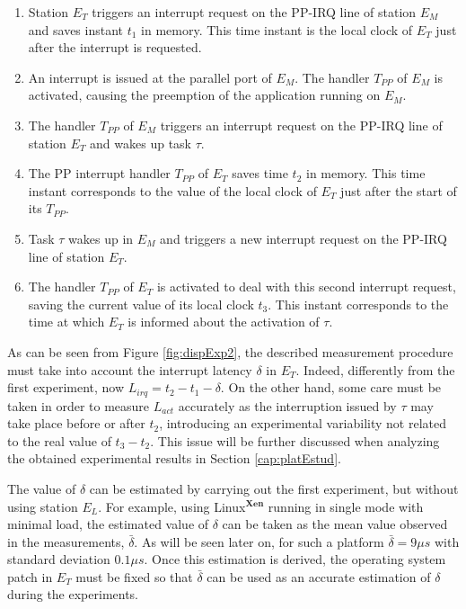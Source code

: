 \documentclass{acm_proc_article-sp}
\begin{document}
\begin{enumerate}
\item Station $E_T$ triggers an interrupt request on the PP-IRQ line of station
  $E_M$ and saves instant $t_1$ in memory. This time instant is the local clock of
  $E_T$ just after the interrupt is requested.
 
\item An interrupt is issued at the parallel port of $E_M$. The handler
  $T_{PP}$ of $E_M$ is activated, causing the preemption of the application running on
  $E_M$.

\item The handler $T_{PP}$ of $E_M$ triggers an interrupt request on the PP-IRQ line
  of station $E_T$ and wakes up task $\tau$.
  
\item The PP interrupt handler $T_{PP}$ of $E_T$ saves time $t_2$ in memory.
  This time instant corresponds to the value of the local clock of $E_T$ just after
  the start of its $T_{PP}$.
  
\item Task $\tau$ wakes up in $E_M$ and triggers a new interrupt request on the
  PP-IRQ line of station $E_T$.
  
\item The handler $T_{PP}$ of $E_T$ is activated to deal with this second interrupt
  request, saving the current value of its local clock $t_3$. This instant
  corresponds to the time at which $E_T$ is informed about the activation of $\tau$.
\end{enumerate}

As can be seen from Figure \ref{fig:dispExp2}, the described measurement procedure
must take into account the interrupt latency $\delta$ in $E_T$. Indeed, differently
from the first experiment, now $L_{irq} = t_2 - t_1 - \delta$.  On the other hand,
some care must be taken in order to measure $L_{act}$ accurately as the
interruption issued by $\tau$ may take place before or after $t_2$, introducing an
experimental variability not related to the real value of $t_3 - t_2$. This issue
will be further discussed when analyzing the obtained experimental results in
Section \ref{cap:platEstud}.

The value of $\delta$ can be estimated by carrying out the first experiment, but
without using station $E_L$. For example, using Linux$^{\mathbf{Xen}}$ running in
single mode with minimal load, the estimated value of $\delta$ can be taken as the
mean value observed in the measurements, $\bar{\delta}$. As will be seen later on,
for such a platform $\bar{\delta} = 9 \mu s$ with standard deviation $0.1 \mu
s$. Once this estimation is derived, the operating system patch in
$E_T$ must be fixed so that $\bar{\delta}$ can be used as an accurate estimation of
$\delta$ during the experiments.
\end{document}
